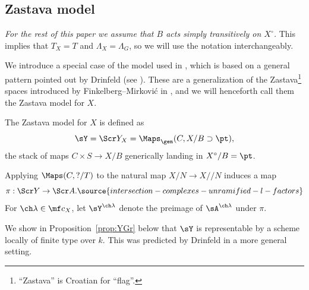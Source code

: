 \subsection{Zastava model} \label{sect:localmodel}

\emph{For the rest of this paper we assume that $B$ acts simply transitively on $X^\circ$.}
This implies that $T_X = T$ and $\Lambda_X = \Lambda_G$, so we will use the notation
interchangeably.



We introduce a special case of the model used in \cite[Part III]{GN}, which is based
on a general pattern pointed out by Drinfeld (see \cite[\S 4.2--4.4]{Drinfeld}).
These are a generalization of the Zastava\footnote{``Zastava'' is Croatian for ``flag''.} spaces introduced by Finkelberg--Mirkovi\'c in \cite{FM,FFKM,BFGM}, and we will henceforth call them the Zastava model for $X$.



The Zastava model for $X$ is defined as
\begin{equation}
    \sY = \Scr Y_{X} = \Maps_\gen(C, X/B \supset \pt),
\end{equation}
the stack of maps $C \times S \to X/B$ generically landing
in $X^\circ/B=\pt$.


Applying $\Maps(C,?/T)$ to the natural map $X/N \to X/\!\!/N $ induces a map
\begin{equation}\label{mappi} \pi: \Scr Y \to \Scr A.
\source{intersection-complexes-unramified-l-factors}
\end{equation}
For $\ch\lambda \in \mf c_X$, let $\sY^{\ch\lambda}$ denote the preimage of
$\sA^{\ch\lambda}$ under $\pi$.

We show in Proposition~\ref{prop:YGr} below that $\sY$ is representable by a
scheme locally of finite type over $k$. This was predicted by
Drinfeld \cite[Conjecture 4.2.3]{Drinfeld} in
a more general setting.

